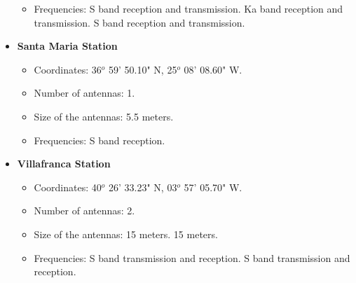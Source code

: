 \begin{itemize}
\begin{itemize}
\item Frequencies: S band reception and transmission. Ka band reception and transmission. S band reception and transmission.
\end{itemize}
\item \textbf{Santa Maria Station}
\begin{itemize}
\item Coordinates: 36$^{o}$ 59' 50.10" N, 25$^{o}$ 08' 08.60" W.
\item Number of antennas: 1.
\item Size of the antennas: 5.5 meters.
\item Frequencies: S band reception.
\end{itemize}
\item \textbf{Villafranca Station}
\begin{itemize}
\item Coordinates: 40$^{o}$ 26' 33.23" N, 03$^{o}$ 57' 05.70" W.
\item Number of antennas: 2.
\item Size of the antennas: 15 meters. 15 meters.
\item Frequencies: S band transmission and reception. S band transmission and reception.
\end{itemize}
\end{itemize}

